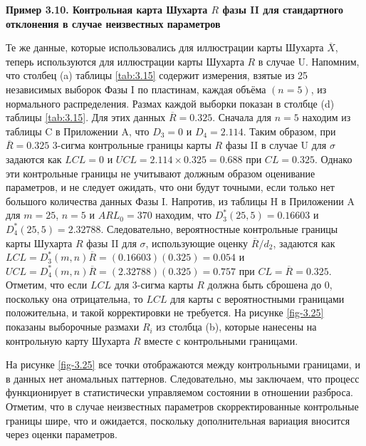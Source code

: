 \noindent\textbf{Пример 3.10. Контрольная карта Шухарта \(R\) фазы II для стандартного отклонения в случае неизвестных параметров}

Те же данные, которые использовались для иллюстрации карты Шухарта \(\overline{X}\), теперь используются для иллюстрации карты Шухарта \(R\) в случае U. Напомним, что столбец (a) таблицы \ref{tab:3.15} содержит измерения, взятые из 25 независимых выборок Фазы I по пластинам, каждая объёма \((n = 5)\), из нормального распределения. %
Размах каждой выборки показан в столбце (d) таблицы \ref{tab:3.15}. %
Для этих данных \(\overline{R} = 0.325\). Сначала для \(n = 5\) находим из таблицы C в Приложении A, что \(D_3 = 0\) и \(D_4 = 2.114\). Таким образом, при \(\overline{R} = 0.325\) 3-сигма контрольные границы карты \(R\) фазы II в случае U для \(\sigma\) задаются как \(LCL = 0\) и \(UCL = 2.114 \times 0.325 = 0.688\) при \(CL = 0.325\). Однако эти контрольные границы не учитывают должным образом оценивание параметров, и не следует ожидать, что они будут точными, если только нет большого количества данных Фазы I. Напротив, из таблицы H в Приложении A для \(m = 25\), \(n = 5\) и \(ARL_0 = 370\) находим, что \(D_3^*(25, 5) = 0.16603\) и \(D_4^*(25, 5) = 2.32788\). Следовательно, вероятностные контрольные границы карты Шухарта \(R\) фазы II для \(\sigma\), использующие оценку \(\overline{R}/d_2\), задаются как \(LCL = D_3^*(m, n)\overline{R} = (0.16603)(0.325) = 0.054\) и \(UCL = D_4^*(m, n)\overline{R} = (2.32788)(0.325) = 0.757\) при \(CL = \overline{R} = 0.325\). Отметим, что если \(LCL\) для 3-сигма карты \(R\) должна быть сброшена до 0, поскольку она отрицательна, то \(LCL\) для карты с вероятностными границами положительна, и такой корректировки не требуется. На рисунке \ref{fig-3.25} показаны выборочные размахи \(R_i\) из столбца (b), которые нанесены на контрольную карту Шухарта \(R\) вместе с контрольными границами. %

На рисунке \ref{fig-3.25} все точки отображаются между контрольными границами, и в данных нет аномальных паттернов. Следовательно, мы заключаем, что процесс функционирует в статистически управляемом состоянии в отношении разброса. Отметим, что в случае неизвестных параметров скорректированные контрольные границы шире, что и ожидается, поскольку дополнительная вариация вносится через оценки параметров.

